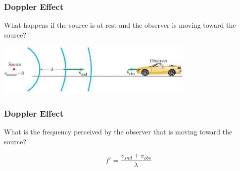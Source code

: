 \documentclass[]{beamer}
\begin{document}











\begin{frame}
\frametitle{Doppler Effect}


What happens if the source is at rest and the observer is moving toward the source?



  \begin{center}
  \includegraphics[height=1.0in]{images4/doppler6b.jpg}
\end{center}


  \end{frame}








\begin{frame}
\frametitle{Doppler Effect}


What is the frequency perceived by the observer that is moving toward the source?
\pause

\begin{equation}
f'=\frac{v_{snd}+v_{obs}}{\lambda}
\end{equation}



  \end{frame}
\end{document}
